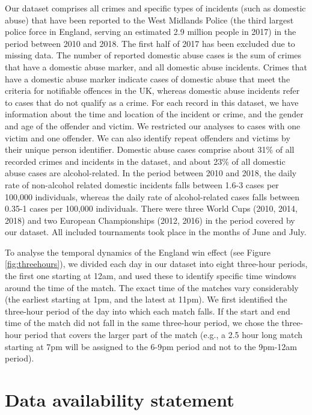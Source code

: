 \documentclass[12pt, letterpaper]{article}
\begin{document}
Our dataset comprises all crimes and specific types of incidents (such as domestic abuse) that have been reported to the West Midlands Police (the third largest police force in England\autocite{Homeoffice}, serving an estimated 2.9 million people in 2017\autocite{populationfigure}) in the period between 2010 and 2018. The first half of 2017 has been excluded due to missing data. The number of reported domestic abuse cases is the sum of crimes that have a domestic abuse marker, and all domestic abuse incidents. Crimes that have a domestic abuse marker indicate cases of domestic abuse that meet the criteria for notifiable offences in the UK, whereas domestic abuse incidents refer to cases that do not qualify as a crime. For each record in this dataset, we have information about the time and location of the incident or crime, and the gender and age of the offender and victim. We restricted our analyses to cases with one victim and one offender. We can also identify repeat offenders and victims by their unique person identifier. Domestic abuse cases comprise about 31\% of all recorded crimes and incidents in the dataset, and about 23\% of all domestic abuse cases are alcohol-related. In the period between 2010 and 2018, the daily rate of non-alcohol related domestic incidents falls between 1.6-3 cases per 100,000 individuals, whereas the daily rate of alcohol-related cases falls between 0.35-1 cases per 100,000 individuals. There were three World Cups (2010, 2014, 2018) and two European Championships (2012, 2016) in the period covered by our dataset. All included tournaments took place in the months of June and July.

 To analyse the temporal dynamics of the England win effect (see Figure \ref{fig:threehours}), we divided each day in our dataset into eight three-hour periods, the first one starting at 12am, and used these to identify specific time windows around the time of the match. The exact time of the matches vary considerably (the earliest starting at 1pm, and the latest at 11pm). We first identified the three-hour period of the day into which each match falls. If the start and end time of the match did not fall in the same three-hour period, we chose the three-hour period that covers the larger part of the match (e.g., a 2.5 hour long match starting at 7pm will be assigned to the 6-9pm period and not to the 9pm-12am period).


\section*{Data availability statement}
\end{document}
